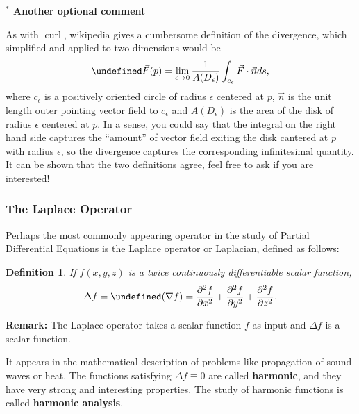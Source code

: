 \documentclass[12pt]{article}
\newcommand{\p}{\partial}
\newcommand{\e}{\epsilon}
\newcommand{\vF}{\vec{F}}
\DeclareMathOperator{\curl}{curl}
\newcommand{\n}{\nabla}
\let \div \undefined
\DeclareMathOperator{\div}{div}
\newtheorem{defn}{Definition}
\begin{document}
\textbf{${}^*$ Another optional comment}


As with $\curl$, wikipedia gives a cumbersome definition of the divergence, which simplified and applied to two dimensions would be $$\div\vF(p)=\lim_{\e\to 0}\frac{1}{A(D_\e)}\int_{c_e} \vF\cdot \vec{n}ds,$$ where $c_\e$ is a positively oriented circle of radius $\e$ centered at $p$, $\vec{n}$ is the unit length outer pointing vector field to $c_\e$ and $A(D_\e)$ is the area of the disk of radius $\e$ centered at $p$. In a sense, you could say that the integral on the right hand side captures the ``amount'' of vector field exiting the disk cantered at $p$ with radius $\e$, so the divergence captures the corresponding infinitesimal quantity. It can be shown that the two definitions agree, feel free to ask if you are interested!




\subsubsection*{The Laplace Operator}
Perhaps the most commonly appearing operator in the study of Partial Differential Equations is the Laplace operator or Laplacian, defined as follows:
\begin{defn}
If $f(x,y,z)$ is a twice continuously differentiable scalar function, $$\Delta f=\div (\n f)=\frac{\p^2f}{\p x^2}+\frac{\p^2f}{\p y^2}+\frac{\p^2f}{\p z^2}.$$
\end{defn}
\textbf{Remark:} The Laplace operator takes a scalar function $f$ as input and $\Delta f$ is a scalar function.

It appears in the mathematical description of problems like propagation of sound waves or heat. The functions satisfying $\Delta f \equiv 0$ are called \textbf{harmonic}, and they have very strong and interesting properties. The study of harmonic functions is called \textbf{harmonic analysis}.
\end{document}
